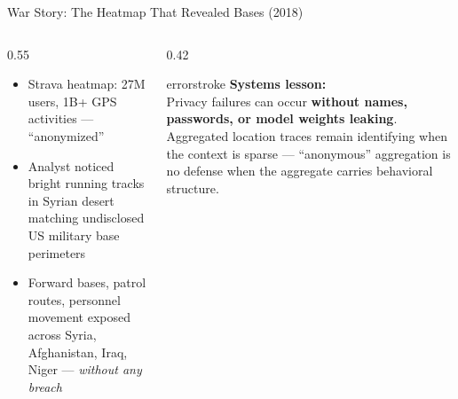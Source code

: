 \documentclass[aspectratio=169, 12pt]{beamer}
\begin{document}
\begin{frame}{War Story: The Heatmap That Revealed Bases (2018)}
\small
\begin{columns}[T]
  \begin{column}{0.55\textwidth}
    \begin{itemize}\setlength\itemsep{2pt}
      \item[\textbf{Context}] Strava heatmap: 27M users, 1B+ GPS activities --- ``anonymized''
      \item[\textbf{Failure}] Analyst noticed bright running tracks in Syrian desert
        matching undisclosed US military base perimeters
      \item[\textbf{Consequence}] Forward bases, patrol routes, personnel movement
        exposed across Syria, Afghanistan, Iraq, Niger --- \emph{without any breach}
    \end{itemize}
  \end{column}
  \begin{column}{0.42\textwidth}
    \begin{mlsyscard}{errorstroke}
    \textbf{Systems lesson:}\\[0.1cm]
    {\footnotesize Privacy failures can occur \textbf{without names, passwords,
    or model weights leaking}. Aggregated location traces remain identifying when
    the context is sparse --- ``anonymous'' aggregation is no defense when the
    aggregate carries behavioral structure.}
    \end{mlsyscard}
  \end{column}
\end{columns}

\vspace{0.1cm}
\small
{}

\end{frame}
\end{document}

